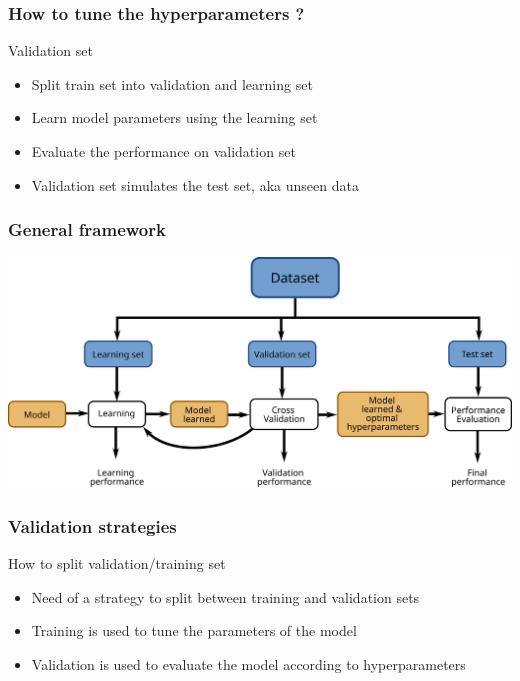 \documentclass[11pt, pdf, compress, handout]{beamer}
\begin{document}
\begin{frame}
  \frametitle{How to tune the hyperparameters ?}
  \begin{block}{Validation set}
    \begin{itemize}
    \item Split train set into validation and learning set
    \item Learn model parameters using the learning set
    \item Evaluate the performance on validation set
    \item Validation set simulates the test set, aka unseen data
    \end{itemize}
  \end{block}
\end{frame}

\begin{frame}
  \frametitle{General framework}
  \includegraphics[width=\textwidth]{cross-validation-framework}
\end{frame}
\begin{frame}
  \frametitle{Validation strategies}
  \begin{block}{How to split validation/training set}
    \begin{itemize}
    \item Need of a strategy to split between training and validation
      sets
    \item Training is used to tune the parameters of the model
    \item Validation is used to evaluate the model according to hyperparameters
    \end{itemize}
  \end{block}
\end{frame}
\end{document}
